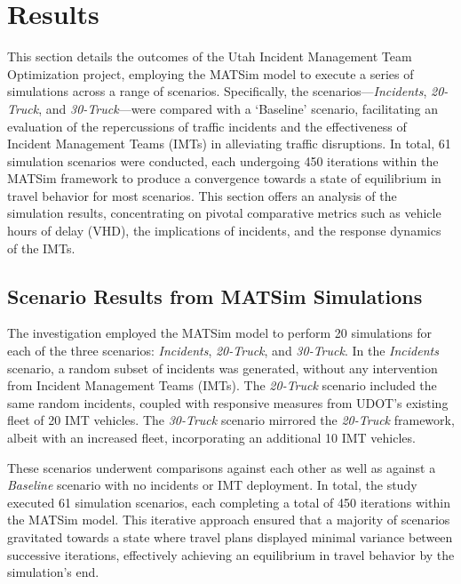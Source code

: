 \documentclass[fancy, oneside, mastersfancy, ms]{byuthesis}
\begin{document}
\hypertarget{results}{%
\chapter{Results}\label{results}}

This section details the outcomes of the Utah Incident Management Team
Optimization project, employing the MATSim model to execute a series of
simulations across a range of scenarios. Specifically, the
scenarios---\emph{Incidents}, \emph{20-Truck}, and
\emph{30-Truck}---were compared with a `Baseline' scenario, facilitating
an evaluation of the repercussions of traffic incidents and the
effectiveness of Incident Management Teams (IMTs) in alleviating traffic
disruptions. In total, 61 simulation scenarios were conducted, each
undergoing 450 iterations within the MATSim framework to produce a
convergence towards a state of equilibrium in travel behavior for most
scenarios. This section offers an analysis of the simulation results,
concentrating on pivotal comparative metrics such as vehicle hours of
delay (VHD), the implications of incidents, and the response dynamics of
the IMTs.

\hypertarget{scenario-results-from-matsim-simulations}{%
\section{Scenario Results from MATSim
Simulations}\label{scenario-results-from-matsim-simulations}}

The investigation employed the MATSim model to perform 20 simulations
for each of the three scenarios: \emph{Incidents}, \emph{20-Truck}, and
\emph{30-Truck}. In the \emph{Incidents} scenario, a random subset of
incidents was generated, without any intervention from Incident
Management Teams (IMTs). The \emph{20-Truck} scenario included the same
random incidents, coupled with responsive measures from UDOT's existing
fleet of 20 IMT vehicles. The \emph{30-Truck} scenario mirrored the
\emph{20-Truck} framework, albeit with an increased fleet, incorporating
an additional 10 IMT vehicles.

These scenarios underwent comparisons against each other as well as
against a \emph{Baseline} scenario with no incidents or IMT deployment.
In total, the study executed 61 simulation scenarios, each completing a
total of 450 iterations within the MATSim model. This iterative approach
ensured that a majority of scenarios gravitated towards a state where
travel plans displayed minimal variance between successive iterations,
effectively achieving an equilibrium in travel behavior by the
simulation's end.
\end{document}
